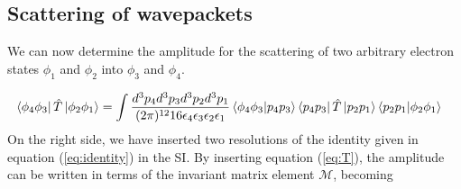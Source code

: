 \documentclass{article}
\begin{document}
%

\subsection{Scattering of wavepackets}
\label{sec:wavepackets}


We can now determine the amplitude for the scattering of two arbitrary electron states
$\phi_1$ and $\phi_2$ into $\phi_3$ and $\phi_4$.

\begin{equation}
\label{eq:amp}
\begin{aligned}
    &\bra{\phi_4\phi_3} \hat{T} \ket{\phi_2\phi_1}
    =
    \int \frac{d^3p_4d^3p_3d^3p_2d^3p_1}
    {(2\pi)^{12} 16\epsilon_4\epsilon_3\epsilon_2\epsilon_1}
    \bra{\phi_4\phi_3}\ket{p_4p_3}
    \bra{p_4p_3}\hat{T}\ket{p_2p_1}
    \bra{p_2p_1} \ket{\phi_2\phi_1}
\end{aligned}
\end{equation}
%
On the right side, we have inserted two resolutions of the identity given in equation (\ref{eq:identity}) in the SI. By inserting equation (\ref{eq:T}), the amplitude can be written in terms of the invariant matrix element $\mathcal{M}$, becoming
\end{document}
